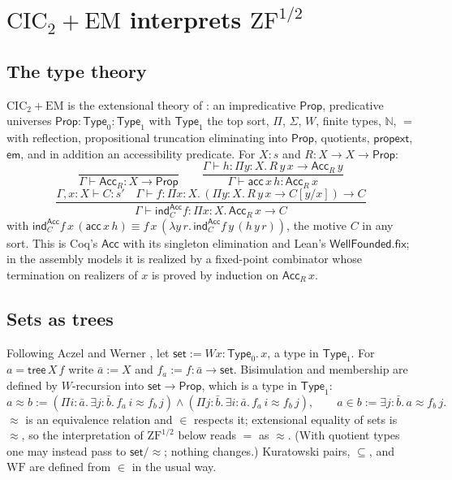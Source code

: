 \documentclass[10pt]{article}
\newcommand{\N}{\mathbb{N}}
\newcommand{\Prop}{\mathsf{Prop}}
\newcommand{\Type}{\mathsf{Type}}
\newcommand{\CIC}{\mathrm{CIC}}
\newcommand{\ZFh}{\mathrm{ZF}^{1/2}}
\newcommand{\EM}{\mathrm{EM}}
\newcommand{\WF}{\mathrm{WF}}
\begin{document}
\section{$\CIC_2+\EM$ interprets $\ZFh$}\label{sec:tt}

\subsection{The type theory}

$\CIC_2+\EM$ is the extensional theory of \cite[\S2]{paper1}: an
impredicative $\Prop$, predicative universes $\Prop:\Type_0:\Type_1$ with
$\Type_1$ the top sort, $\Pi$, $\Sigma$, $W$, finite types, $\N$,
$=$ with reflection, propositional truncation eliminating into $\Prop$,
quotients, $\mathsf{propext}$, $\mathsf{em}$, and in addition an
accessibility predicate. For $X:s$ and $R:X\to X\to\Prop$:
\[
\frac{}{\Gamma\vdash\mathsf{Acc}_R:X\to\Prop}\qquad
\frac{\Gamma\vdash h:\Pi y{:}X.\,R\,y\,x\to\mathsf{Acc}_R\,y}{\Gamma\vdash\mathsf{acc}\,x\,h:\mathsf{Acc}_R\,x}
\]
\[
\frac{\Gamma,x{:}X\vdash C:s'\quad
      \Gamma\vdash f:\Pi x{:}X.\,(\Pi y{:}X.\,R\,y\,x\to C[y/x])\to C}
     {\Gamma\vdash\mathsf{ind}^{\mathsf{Acc}}_C f:\Pi x{:}X.\,\mathsf{Acc}_R\,x\to C}
\]
with $\mathsf{ind}^{\mathsf{Acc}}_C f\,x\,(\mathsf{acc}\,x\,h)\equiv
f\,x\,(\lambda y\,r.\,\mathsf{ind}^{\mathsf{Acc}}_C f\,y\,(h\,y\,r))$, the
motive $C$ in any sort. This is Coq's $\mathsf{Acc}$ with its singleton
elimination and Lean's $\mathsf{WellFounded.fix}$; in the assembly models
it is realized by a fixed-point combinator whose termination on
realizers of $x$ is proved by induction on $\mathsf{Acc}_R\,x$.

\subsection{Sets as trees}

Following Aczel and Werner \cite{aczel78,werner97}, let
$\mathsf{set}:=Wx{:}\Type_0.\,x$, a type in $\Type_1$. For
$a=\mathsf{tree}\,X\,f$ write $\bar a:=X$ and $f_a:=f:\bar a\to\mathsf{set}$.
Bisimulation and membership are defined by $W$-recursion into
$\mathsf{set}\to\Prop$, which is a type in $\Type_1$:
\[
a\approx b:=(\Pi i{:}\bar a.\,\exists j{:}\bar b.\,f_a\,i\approx f_b\,j)\wedge
            (\Pi j{:}\bar b.\,\exists i{:}\bar a.\,f_a\,i\approx f_b\,j),\qquad
a\in b:=\exists j{:}\bar b.\,a\approx f_b\,j.
\]
$\approx$ is an equivalence relation and $\in$ respects it; extensional
equality of sets is $\approx$, so the interpretation of $\ZFh$ below
reads $=$ as $\approx$. (With quotient types one may instead pass to
$\mathsf{set}/{\approx}$; nothing changes.) Kuratowski pairs, $\subseteq$,
and $\WF$ are defined from $\in$ in the usual way.
\end{document}

